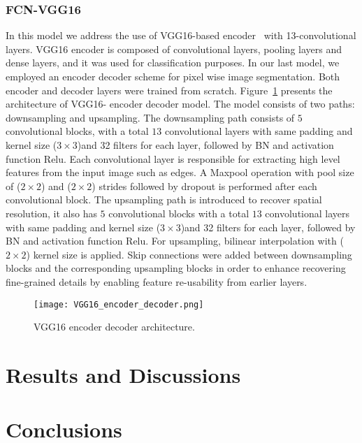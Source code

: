 \documentclass[preprint,9pt]{elsarticle}
\begin{document}
	\subsubsection{FCN-VGG16}
	In this model we address the use of VGG16-based encoder~\cite{Simonyan2015} with 13-convolutional layers.
	VGG16 encoder is composed of convolutional layers, pooling layers and dense layers, and it was used for classification purposes. 
	In our last model, we employed an encoder decoder scheme for pixel wise image segmentation. 
	Both encoder and decoder layers were trained from scratch.
	Figure~\ref{vgg16} presents the architecture of VGG16- encoder decoder model. 
	The model consists of two paths: downsampling and upsampling.
	The downsampling path consists of \(5\) convolutional blocks,  with a total \(13\) convolutional layers  with same padding and kernel size (\(3\times3\))and 32 filters for each layer, followed by BN and activation function Relu.
	Each convolutional layer is responsible for extracting high level features from the input image such as edges.
	A Maxpool operation with pool size of (\(2\times2\))  and (\(2\times2\)) strides followed by dropout is performed after each convolutional block. 
	The upsampling path is introduced to recover spatial resolution, it also has \(5\) convolutional blocks with a total \(13\) convolutional layers  with same padding and kernel size (\(3\times3\))and 32 filters for each layer, followed by BN and activation function Relu.
	For upsampling, bilinear interpolation with (\(2\times2\)) kernel size is applied.
	Skip connections were added between downsampling blocks and the corresponding upsampling blocks in order to enhance recovering fine-grained details by enabling feature re-usability from earlier layers.
	\begin{figure} [h!]
		\begin{center}
			\texttt{[image: VGG16\_encoder\_decoder.png]}
		\end{center}
		\caption{VGG16 encoder decoder architecture.} 
		\label{vgg16}
	\end{figure}

	\section{Results and Discussions}
	

	\section{Conclusions}



	\section*{}

	
	\section*{ }
	
	
	
	
\end{document}
